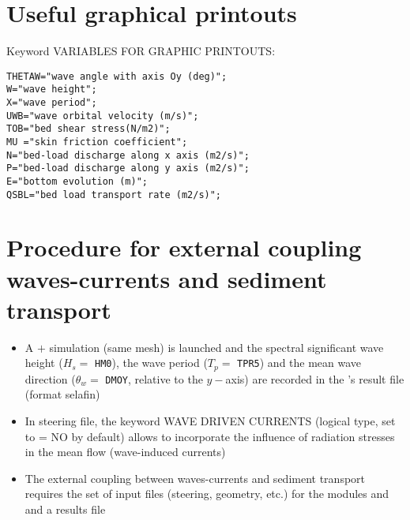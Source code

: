 \section{Useful graphical printouts}
Keyword {\ttfamily VARIABLES FOR GRAPHIC PRINTOUTS}:
\begin{lstlisting}[frame=trBL]  
THETAW="wave angle with axis Oy (deg)";
W="wave height";
X="wave period";
UWB="wave orbital velocity (m/s)";
TOB="bed shear stress(N/m2)";
MU ="skin friction coefficient";
N="bed-load discharge along x axis (m2/s)";
P="bed-load discharge along y axis (m2/s)";
E="bottom evolution (m)";
QSBL="bed load transport rate (m2/s)";
\end{lstlisting}

\section{Procedure for external coupling waves-currents and sediment transport}
\begin{itemize}
\item A  $+$ \tomawac{} simulation (same mesh) is launched and the spectral significant wave height ($H_s =$ \texttt{HM0}), the wave period ($T_p =$ \texttt{TPR5}) and the mean wave direction ($\theta_w =$ \texttt{DMOY}, relative to the $y-$axis) are recorded in the \tomawac{}'s result file (format selafin)

\item In  steering file, the keyword {\ttfamily WAVE DRIVEN CURRENTS} (logical type, set to {\ttfamily = NO} by default) allows to incorporate the influence of radiation stresses in the mean flow (wave-induced currents)

\item The external coupling between waves-currents and sediment transport requires the set of input files (steering, geometry, etc.) for the modules  and \sisyphe{} and a results file \tomawac{} 



\end{itemize}

